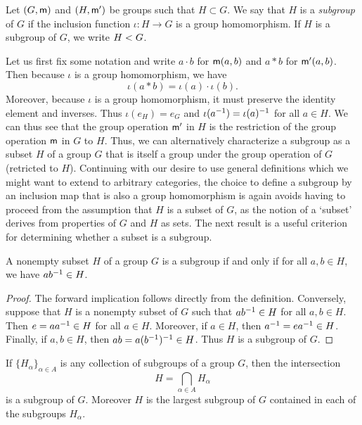 \begin{definition}
    Let \((G, {\mathsf{m}})\) and \((H, {\mathsf{m}}')\) be groups such that \(H \subset G\).
    We say that \(H\) is a \emph{subgroup} of \(G\) if the inclusion function
    \(\iota : H \to G\) is a group homomorphism. If \(H\) is a subgroup of
    \(G\), we write \(H < G\).
\end{definition}

Let us first fix some notation and write \(a \cdot b\) for \({\mathsf{m}}(a,b)\) and
\(a * b\) for \({\mathsf{m}}'(a,b)\). Then because \(\iota\) is a group homomorphism,
we have
\[
    \iota(a * b) = \iota(a) \cdot \iota(b).
\]
Moreover, because \(\iota\) is a group homomorphism, it must preserve the
identity element and inverses. Thus \(\iota(e_H) = e_G\) and \(\iota(a^{-1}) =
\iota(a)^{-1}\) for all \(a \in H\). We can thus see that the group operation
\({\mathsf{m}}'\) in \(H\) is the restriction of the group operation \({\mathsf{m}}\) in \(G\)
to \(H\). Thus, we can alternatively characterize a subgroup as a subset \(H\)
of a group \(G\) that is itself a group under the group operation of \(G\)
(retricted to \(H\)). Continuing with our desire to use general definitions
which we might want to extend to arbitrary categories, the choice to define a
subgroup by an inclusion map that is also a group homomorphism is again avoids
having to proceed from the assumption that \(H\) is a subset of \(G\), as the
notion of a `subset' derives from properties of \(G\) and \(H\) as sets. The
next result is a useful criterion for determining whether a subset is a
subgroup.

\begin{theorem}
    \label{thm:subgroup-test}
    A nonempty subset \(H\) of a group \(G\) is a subgroup if and only if for
    all \(a, b \in H\), we have \(ab^{-1} \in H\).
\end{theorem}

\begin{proof}
    The forward implication follows directly from the definition. Conversely,
    suppose that \(H\) is a nonempty subset of \(G\) such that \(ab^{-1} \in H\)
    for all \(a, b \in H\). Then \(e = aa^{-1} \in H\) for all \(a \in H\).
    Moreover, if \(a \in H\), then \(a^{-1} = ea^{-1} \in H\). Finally, if \(a, b
    \in H\), then \(ab = a(b^{-1})^{-1} \in H\). Thus \(H\) is a subgroup of
    \(G\).
\end{proof}

\begin{theorem}
    \label{thm:intersection-subgroups}
    If \(\{H_{\alpha}\}_{\alpha \in A}\) is any collection of subgroups of a
    group \(G\), then the intersection
    \[
        H = \bigcap_{\alpha \in A} H_{\alpha}
    \]
    is a subgroup of \(G\). Moreover \(H\) is the largest subgroup of \(G\)
    contained in each of the subgroups \(H_{\alpha}\).
\end{theorem}

